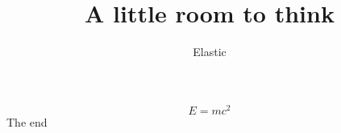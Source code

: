 \documentclass[11pt]{article}
\title{A little room to think}
\author{Elastic}
\date{}
\begin{document}
\maketitle

\begin{equation}
  E = mc^2
\end{equation}
The end
\end{document}
